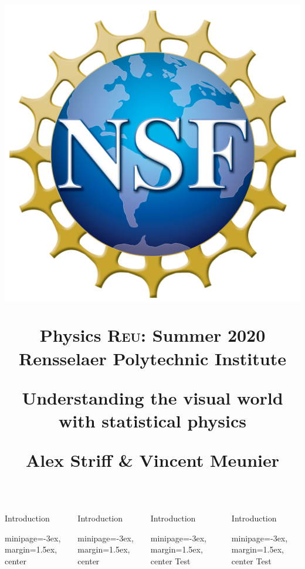 \documentclass[final]{beamer}
\title
{%
  \parbox{0.02\textwidth}{\hspace{-0.525in}\includegraphics[width=4ex]{nsf}\hfil}%
  \parbox{0.185\textwidth}{
    \small\textbf{%
      Physics \textsc{Reu}: Summer 2020
    }\hfill\\
  Rensselaer Polytechnic Institute\hfil}%
  \parbox{0.54\textwidth}{\hfil\Huge{%
        Understanding the visual world with statistical physics
  }\hfil}%
  \parbox{0.205\textwidth}{\hfill
    Alex Striff \& Vincent Meunier
  }
}
\author{}
\date{}
\newenvironment{mblock}[1]{%
  \begin{block}{#1}%
    \begin{adjustbox}{minipage=\linewidth-3ex, margin=1.5ex, center}}%
{\end{adjustbox}\end{block}}
\begin{document}
\begin{frame}[t]{}
  \vspace{-8pt}
  \begin{beamercolorbox}{}
    \maketitle
  \end{beamercolorbox}
  \vspace{-1.5in}
  \centering
  \begin{columns}
    \begin{column}{0.235\textwidth}
      \pause%
      \begin{mblock}{Introduction}
        \lipsum[1]
      \end{mblock}
    \end{column}
    \begin{column}{0.235\textwidth}
      \pause%
      \begin{mblock}{Introduction}
        \lipsum[1]
      \end{mblock}
    \end{column}
    \begin{column}{0.235\textwidth}
      \begin{mblock}{Introduction}
        Test
      \end{mblock}
    \end{column}
    \begin{column}{0.235\textwidth}
      \begin{mblock}{Introduction}
        Test
      \end{mblock}
    \end{column}
  \end{columns}
\end{frame}
\end{document}

